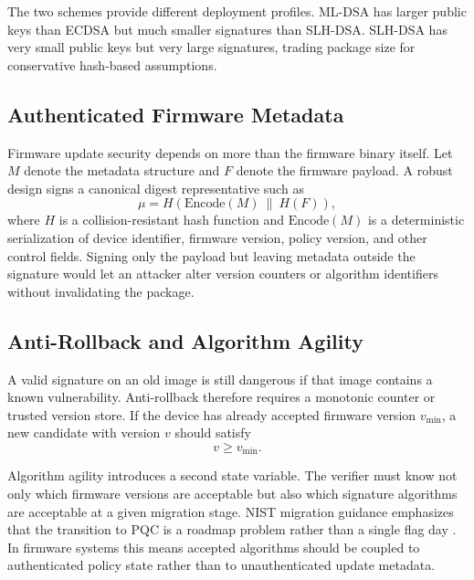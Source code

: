 The two schemes provide different deployment profiles. ML-DSA has larger public keys than ECDSA but much smaller signatures than SLH-DSA. SLH-DSA has very small public keys but very large signatures, trading package size for conservative hash-based assumptions.

\subsection{Authenticated Firmware Metadata}

Firmware update security depends on more than the firmware binary itself. Let $M$ denote the metadata structure and $F$ denote the firmware payload. A robust design signs a canonical digest representative such as
\begin{equation}
\mu = H(\text{Encode}(M)\ \|\ H(F)),
\label{eq:manifest_digest}
\end{equation}
where $H$ is a collision-resistant hash function and $\text{Encode}(M)$ is a deterministic serialization of device identifier, firmware version, policy version, and other control fields. Signing only the payload but leaving metadata outside the signature would let an attacker alter version counters or algorithm identifiers without invalidating the package.

\subsection{Anti-Rollback and Algorithm Agility}

A valid signature on an old image is still dangerous if that image contains a known vulnerability. Anti-rollback therefore requires a monotonic counter or trusted version store. If the device has already accepted firmware version $v_{\min}$, a new candidate with version $v$ should satisfy
\begin{equation}
v \geq v_{\min}.
\label{eq:rollback}
\end{equation}

Algorithm agility introduces a second state variable. The verifier must know not only which firmware versions are acceptable but also which signature algorithms are acceptable at a given migration stage. NIST migration guidance emphasizes that the transition to PQC is a roadmap problem rather than a single flag day \cite{nist_sp180038c,nist_ir8547}. In firmware systems this means accepted algorithms should be coupled to authenticated policy state rather than to unauthenticated update metadata.

